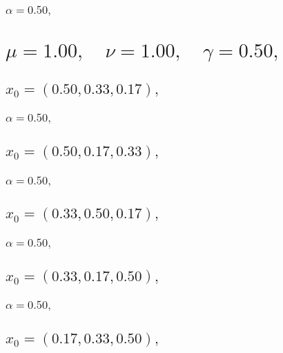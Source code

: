 \documentclass[a4paper]{article}
\begin{document}
\begin{multicols*}{2}
   \subsubsection{\(\alpha = 0.50,\quad \)}
   

   \section{\(\mu = 1.00,\quad \nu = 1.00,\quad \gamma = 0.50,\quad \)}
   

   \subsection{\(x_0 = (0.50,0.33,0.17),\quad \)}
   

   \subsubsection{\(\alpha = 0.50,\quad \)}
   

   \subsection{\(x_0 = (0.50,0.17,0.33),\quad \)}
   

   \subsubsection{\(\alpha = 0.50,\quad \)}
   

   \subsection{\(x_0 = (0.33,0.50,0.17),\quad \)}
   

   \subsubsection{\(\alpha = 0.50,\quad \)}
   

   \subsection{\(x_0 = (0.33,0.17,0.50),\quad \)}
   

   \subsubsection{\(\alpha = 0.50,\quad \)}
   

   \subsection{\(x_0 = (0.17,0.33,0.50),\quad \)}
   


\end{multicols*}
\end{document}
